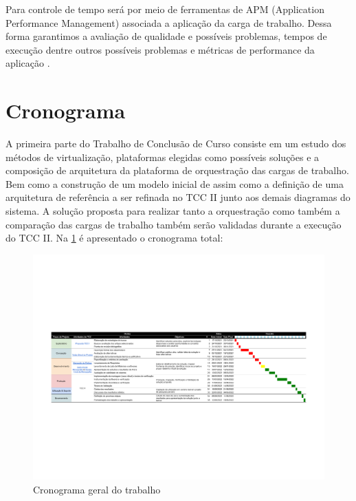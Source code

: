 Para controle de tempo será por meio de ferramentas de APM (Application Performance Management) associada a aplicação da carga de trabalho. Dessa forma garantimos a avaliação de qualidade e possíveis problemas, tempos de execução dentre outros possíveis problemas e métricas de performance da aplicação \cite{tang2021systematical}.


\section{Cronograma}
A primeira parte do Trabalho de Conclusão de Curso consiste em um estudo dos métodos de virtualização, plataformas elegidas como possíveis soluções e a composição de arquitetura da plataforma de orquestração das cargas de trabalho. Bem como a construção de um modelo inicial de assim como a definição de uma arquitetura de referência a ser refinada no TCC II junto aos demais diagramas do sistema. A solução proposta para realizar tanto a orquestração como também a comparação das cargas de trabalho também serão validadas durante a execução do TCC II.
Na \ref{fig:cronograma} é apresentado o cronograma total:

\begin{landscape}
\begin{figure}[!ht]
    \centering
    \includegraphics[width=\linewidth]{04-figuras/TCC cronograma - Sheet1.pdf}
    \caption{Cronograma geral do trabalho}
    \label{fig:cronograma}
\end{figure}
\end{landscape}